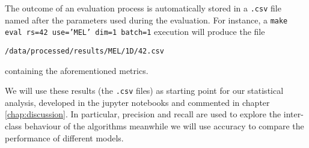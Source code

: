 The outcome of an evaluation process is automatically stored in a \texttt{.csv} file named after the parameters used during the evaluation. For instance, a \texttt{make eval rs=42 use='MEL' dim=1 batch=1} execution will produce the file

\begin{center}
  \texttt{/data/processed/results/MEL/1D/42.csv}
\end{center}

containing the aforementioned metrics.


We will use these results (the \texttt{.csv} files) as starting point for our statistical analysis, developed in the jupyter notebooks and commented in chapter \ref{chap:discussion}. In particular, precision and recall are used to explore the inter-class behaviour of the algorithms meanwhile we will use accuracy to compare the performance of different models.

